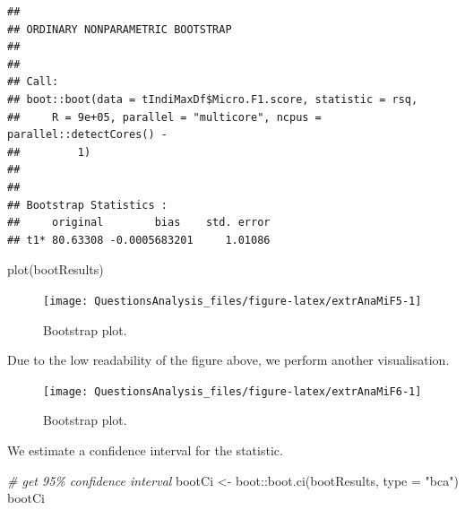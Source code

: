 \documentclass[
]{article}
\newenvironment{Shaded}{\begin{snugshade}}{\end{snugshade}}
\newcommand{\AttributeTok}[1]{\textcolor[rgb]{0.77,0.63,0.00}{#1}}
\newcommand{\CommentTok}[1]{\textcolor[rgb]{0.56,0.35,0.01}{\textit{#1}}}
\newcommand{\FunctionTok}[1]{\textcolor[rgb]{0.00,0.00,0.00}{#1}}
\newcommand{\NormalTok}[1]{#1}
\newcommand{\OtherTok}[1]{\textcolor[rgb]{0.56,0.35,0.01}{#1}}
\newcommand{\SpecialCharTok}[1]{\textcolor[rgb]{0.00,0.00,0.00}{#1}}
\newcommand{\StringTok}[1]{\textcolor[rgb]{0.31,0.60,0.02}{#1}}
\begin{document}
\begin{verbatim}
## 
## ORDINARY NONPARAMETRIC BOOTSTRAP
## 
## 
## Call:
## boot::boot(data = tIndiMaxDf$Micro.F1.score, statistic = rsq, 
##     R = 9e+05, parallel = "multicore", ncpus = parallel::detectCores() - 
##         1)
## 
## 
## Bootstrap Statistics :
##     original        bias    std. error
## t1* 80.63308 -0.0005683201     1.01086
\end{verbatim}

\begin{Shaded}
\begin{Highlighting}[]
\FunctionTok{plot}\NormalTok{(bootResults)}
\end{Highlighting}
\end{Shaded}

\begin{figure}

{\centering \texttt{[image: QuestionsAnalysis\_files/figure-latex/extrAnaMiF5-1]} 

}

\caption{Bootstrap plot.}\label{fig:extrAnaMiF5}
\end{figure}

Due to the low readability of the figure above, we perform another visualisation.

\begin{Shaded}
\end{Shaded}

\begin{figure}

{\centering \texttt{[image: QuestionsAnalysis\_files/figure-latex/extrAnaMiF6-1]} 

}

\caption{Bootstrap plot.}\label{fig:extrAnaMiF6}
\end{figure}

We estimate a confidence interval for the statistic.

\begin{Shaded}
\begin{Highlighting}[]
\CommentTok{\# get 95\% confidence interval}
\NormalTok{bootCi }\OtherTok{\textless{}{-}}\NormalTok{ boot}\SpecialCharTok{::}\FunctionTok{boot.ci}\NormalTok{(bootResults, }\AttributeTok{type =} \StringTok{"bca"}\NormalTok{)}
\NormalTok{bootCi}
\end{Highlighting}
\end{Shaded}
\end{document}
